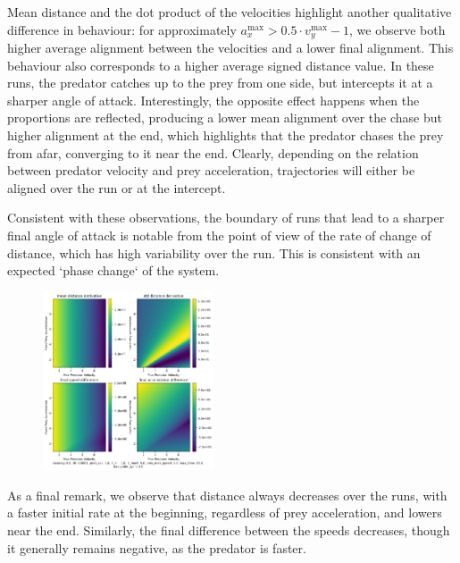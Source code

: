 \documentclass[10pt, twocolumn]{article}
\begin{document}
          Mean distance and the dot product of the velocities highlight another qualitative difference in behaviour: for approximately $a^{\text{max}}_x > 0.5\cdot v^{\text{max}}_y - 1$, we observe both higher average alignment between the velocities and a lower final alignment. This behaviour also corresponds to a higher average signed distance value. In these runs, the predator catches up to the prey from one side, but intercepts it at a sharper angle of attack. Interestingly, the opposite effect happens when the proportions are reflected, producing a lower mean alignment over the chase but higher alignment at the end, which highlights that the predator chases the prey from afar, converging to it near the end. Clearly, depending on the relation between predator velocity and prey acceleration, trajectories will either be aligned over the run or at the intercept.

          Consistent with these observations, the boundary of runs that lead to a sharper final angle of attack is notable from the point of view of the rate of change of distance, which has high variability over the run. This is consistent with an expected `phase change` of the system.

          \begin{figure}[H]
            \centering
            \includegraphics[width=0.45\textwidth]{figures/phase_derivative_dist.png}
            \label{fig:phaseplot3}
          \end{figure}

          As a final remark, we observe that distance always decreases over the runs, with a faster initial rate at the beginning, regardless of prey acceleration, and lowers near the end. Similarly, the final difference between the speeds decreases, though it generally remains negative, as the predator is faster.
\end{document}
